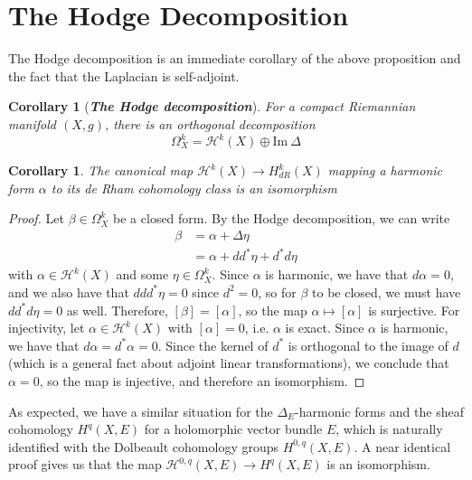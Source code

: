 \documentclass[psamsfonts, 12pt]{amsart}
\newtheorem{cor}[thm]{Corollary}
\theoremstyle{definition}
\theoremstyle{remark}
\newcommand{\ib}[1]{\textbf{\textit{#1}}}
\begin{document}
\section{The Hodge Decomposition}
%
The Hodge decomposition is an immediate corollary of the above proposition and the
fact that the Laplacian is self-adjoint.
%
\begin{cor}[\ib{The Hodge decomposition}]
For a compact Riemannian manifold $(X,g)$, there is an orthogonal decomposition
\[
\Omega_X^k = \mathcal{H}^k(X) \oplus \mathrm{Im}~\Delta
\]
\end{cor}
%
\begin{cor}
The canonical map $\mathcal{H}^k(X) \to H^k_{dR}(X)$ mapping a harmonic form $\alpha$
to its de Rham cohomology class is an isomorphism
\end{cor}
%
\begin{proof}
Let $\beta \in \Omega^k_X$ be a closed form. By the Hodge decomposition, we can
write
\begin{align*}
\beta &= \alpha + \Delta\eta \\
&= \alpha + dd^*\eta + d^*d\eta
\end{align*}
with $\alpha \in \mathcal{H}^k(X)$ and some $\eta \in \Omega^k_X$. Since $\alpha$ is
harmonic, we have that $d\alpha = 0$, and we also have that $ddd^*\eta = 0$ since
$d^2 = 0$, so for $\beta$ to be closed, we must have $dd^*d\eta = 0$ as well.
Therefore, $[\beta] = [\alpha]$, so the map $\alpha \mapsto [\alpha]$ is surjective.
For injectivity, let $\alpha \in \mathcal{H}^k(X)$ with $[\alpha] = 0$, i.e. $\alpha$
is exact. Since $\alpha$ is harmonic, we have that $d\alpha = d^*\alpha = 0$. Since the
kernel of $d^*$ is orthogonal to the image of $d$ (which is a general fact about
adjoint linear transformations), we conclude that $\alpha = 0$, so the map is injective,
and therefore an isomorphism.
\end{proof}
%
As expected, we have a similar situation for the $\Delta_E$-harmonic forms and
the sheaf cohomology $H^q(X,E)$ for a holomorphic vector bundle $E$, which is naturally
identified with the Dolbeault cohomology groups $H^{0,q}(X,E)$. A near identical proof
gives us that the map $\mathcal{H}^{0,q}(X,E) \to H^q(X,E)$ is an isomorphism. \\
\end{document}
